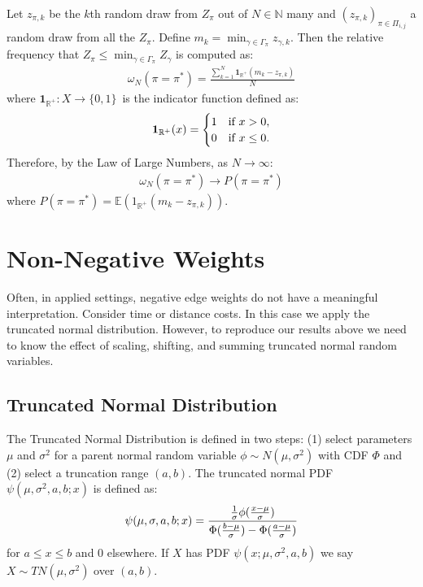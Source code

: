 \documentclass[twocolumn]{article}
\begin{document}
Let $z_{\pi,k}$ be the $k$th random draw from  $Z_{\pi}$ out of $N \in{{\mathbb N}}$ many and $(z_{\pi,k})_{\pi \in \Pi_{i,j}}$ a random draw from all the $Z_{\pi}$. Define $m_{k}=\min_{\gamma \in \Gamma_{\pi}} z_{\gamma,k}$. Then the relative frequency that  $Z_{\pi}\leq\min_{\gamma \in \Gamma_{\pi}} Z_{\gamma}$ is computed as:
\begin{gather}
\omega_{N}(\pi = \pi^{\ast}) = \frac{ \sum_{k=1}^{N} \mathbf {1} _{{{\mathbb R}}^{+}}(m_{k}-z_{\pi,k})}{N}
\end{gather}
where $\mathbf {1} _{{{\mathbb R}}^{+}}\colon X\to \{0,1\}\,$ is the indicator function defined as:
\begin{gather}
{\displaystyle \mathbf {1} _{{{\mathbb R}}^{+}}(x)={\begin{cases}1&{\text{if }}x > 0,\\0&{\text{if }}x \leq 0.\end{cases}}} \notag
\end{gather}
Therefore, by the Law of Large Numbers, as $ N \rightarrow \infty$:
\begin{gather}
\omega_{N}(\pi = \pi^{\ast})\longrightarrow P(\pi = \pi^{\ast})
\end{gather}
where $P(\pi = \pi^{\ast}) = {{\mathbb E}}( {1} _{{{\mathbb R}}^{+}}(m_{k}-z_{\pi,k}))$.




\section{Non-Negative Weights}
Often, in applied settings, negative edge weights do not have a meaningful interpretation. Consider time or distance costs. In this case we apply the truncated normal distribution. However, to reproduce our results above we need to know the effect of scaling, shifting, and summing truncated normal random variables. 


\subsection{Truncated Normal Distribution}
The Truncated Normal Distribution is defined in two steps: (1) select parameters $\mu$ and $\sigma^{2}$ for a parent normal random variable $\phi \sim N(\mu,\sigma^{2})$ with CDF $\Phi$ and (2) select a truncation range $(a,b)$.  The truncated normal PDF $\psi(\mu,\sigma^{2},a,b;x)$ is defined as:
\begin{gather}
\psi(\mu ,\sigma ,a,b;x)={\frac {{\frac {1}{\sigma }}\phi ({\frac {x-\mu }{\sigma }})}{\Phi ({\frac {b-\mu }{\sigma }})-\Phi ({\frac {a-\mu }{\sigma }})}} \notag
\end{gather}
for $a \leq x\leq b$ and $0$ elsewhere. If $X$ has PDF $\psi(x;\mu ,\sigma^{2},a,b)$ we say $X \sim TN(\mu ,\sigma^{2})$ over $(a,b)$.\\
\end{document}
